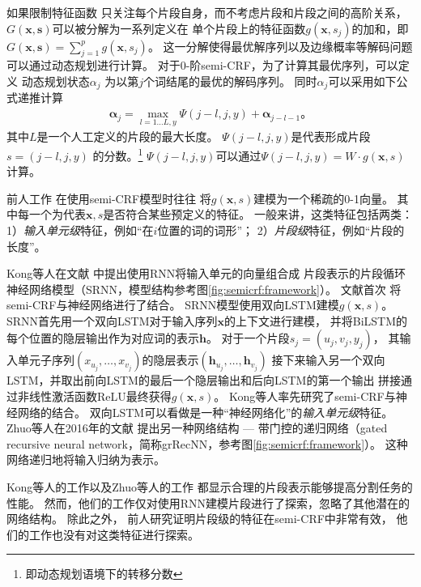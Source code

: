 如果限制特征函数
只关注每个片段自身，而不考虑片段和片段之间的高阶关系，
$G(\mathbf{x},\mathbf{s})$可以被分解为一系列定义在
单个片段上的特征函数$g(\mathbf{x},s_j)$的加和，即
$G(\mathbf{x}, \mathbf{s})=\sum_{j=1}^p g(\mathbf{x},s_j)$。
这一分解使得最优解序列以及边缘概率等解码问题可以通过动态规划进行计算。
对于0-阶semi-CRF，为了计算其最优序列，可以定义
动态规划状态$\alpha_j$
为以第$j$个词结尾的最优的解码序列。
同时$\alpha_j$可以采用如下公式递推计算
\begin{align}\label{eq:semicrf:dp}
\mathbf{\alpha}_j=\max_{l=1\dots L,y} \Psi(j-l,j,y) + \mathbf{\alpha}_{j-l-1}\text{。}
\end{align}
其中$L$是一个人工定义的片段的最大长度。
$\Psi(j-l,j,y)$是代表形成片段$s=(j-l,j,y)$
的分数。\footnote{即动态规划语境下的转移分数}
$\Psi(j-l,j,y)$可以通过$\Psi(j-l,j,y)=W\cdot g(\mathbf{x}, s)$计算。

前人工作\cite{NIPS2005_427,okanohara-EtAl:2006:COLACL,andrew:2006:EMNLP,yang-cardie:2012:EMNLP-CoNLL}
在使用semi-CRF模型时往往
将$g(\mathbf{x},s)$建模为一个稀疏的0-1向量。
其中每一个为代表$\mathbf{x},s$是否符合某些预定义的特征。
一般来讲，这类特征包括两类：1）\textit{输入单元级}特征，例如``在$i$位置的词的词形''；
2）\textit{片段级}特征，例如``片段的长度''。

Kong等人在文献
中提出使用RNN将输入单元的向量组合成
片段表示的片段循环神经网络模型（SRNN，模型结构参考图\ref{fig:semicrf:framework}）。
文献首次
将semi-CRF与神经网络进行了结合。
SRNN模型使用双向LSTM建模$g(\mathbf{x}, s)$。
SRNN首先用一个双向LSTM对于输入序列$\mathbf{x}$的上下文进行建模，
并将BiLSTM的每个位置的隐层输出作为对应词的表示$\mathbf{h}$。
对于一个片段$s_j=(u_j,v_j,y_j)$，
其输入单元子序列$(x_{u_j}, \dots, x_{v_j})$的隐层表示$(\mathbf{h}_{u_{j}}, \dots, \mathbf{h}_{v_j})$
接下来输入另一个双向LSTM，并取出前向LSTM的最后一个隐层输出和后向LSTM的第一个输出
拼接通过非线性激活函数ReLU最终获得$g(\mathbf{x}, s)$。
Kong等人\cite{DBLP:journals/corr/KongDS15}率先研究了semi-CRF与神经网络的结合。
双向LSTM可以看做是一种``神经网络化''的\textit{输入单元级}特征。
Zhuo等人在2016年的文献
提出另一种网络结构 --- 带门控的递归网络（gated recursive neural network，简称grRecNN，参考图\ref{fig:semicrf:framework}）。
这种网络递归地将输入归纳为表示。

Kong等人的工作以及Zhuo等人的工作
都显示合理的片段表示能够提高分割任务的性能。
然而，他们的工作仅对使用RNN建模片段进行了探索，忽略了其他潜在的网络结构。
除此之外，
前人研究证明片段级的特征在semi-CRF中非常有效，
他们的工作也没有对这类特征进行探索。

